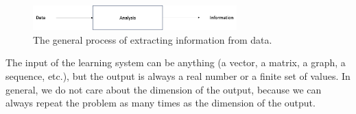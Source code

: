 \begin{figure}
    \centering
    \includegraphics[width=0.7\textwidth]{./figures/chapter_2/data2information.png}
    \caption{The general process of extracting information from data.}
    \label{fig:data2information}
\end{figure}

The input of the learning system can be anything (a vector, a matrix, a graph, a sequence, etc.), but the output is always a real number or a finite set of values. In general,
we do not care about the dimension of the output, because we can always repeat the problem as many times as the dimension of the output.


